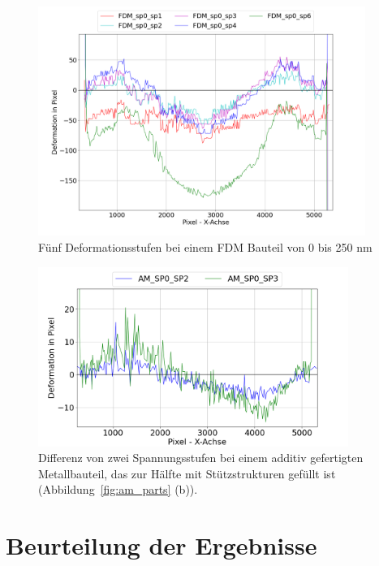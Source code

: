 \begin{figure}[H]
  \centering
  \includegraphics[width=0.95\textwidth]{images/fdm2_all_defos.png}
  \caption{Fünf Deformationsstufen bei einem FDM Bauteil von 0 bis 250 nm}
  \label{fig:fdm_defos}
\end{figure}

\begin{figure}[H]
    \centering
    \includegraphics[width=0.9\textwidth]{images/AM_sp0_sp2_defo_plot.png}
    \caption{Differenz von zwei Spannungsstufen bei einem additiv gefertigten Metallbauteil, 
    das zur Hälfte mit Stützstrukturen gefüllt ist (Abbildung~\ref{fig:am_parts} (b)). }
    \label{fig:deformation_data_am}
\end{figure}

\section{Beurteilung der Ergebnisse}

